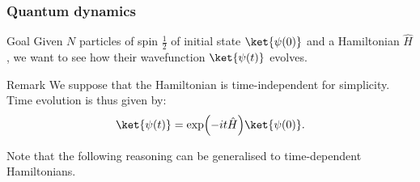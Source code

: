 \documentclass[a4paper]{article}
\begin{document}
\subsubsection{Quantum dynamics}

\begin{parag}{Goal}
    Given $N$ particles of spin $\frac{1}{2}$ of initial state $\ket{\psi\left(0\right)}$ and a Hamiltonian $\hat{H}$, we want to see how their wavefunction $\ket{\psi\left(t\right)}$ evolves.

    \begin{subparag}{Remark}
        We suppose that the Hamiltonian is time-independent for simplicity. Time evolution is thus given by: 
        \[\ket{\psi\left(t\right)} = \exp\left(-i t \hat{H}\right) \ket{\psi\left(0\right)}.\]
        
        Note that the following reasoning can be generalised to time-dependent Hamiltonians.
    \end{subparag}
\end{parag}
\end{document}

